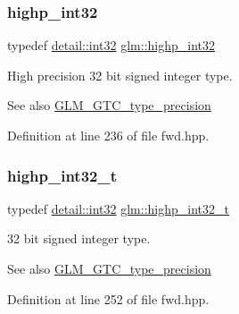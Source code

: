 \subsubsection{\texorpdfstring{highp\+\_\+int32}{highp\_int32}}
{\footnotesize\ttfamily typedef \hyperlink{namespaceglm_1_1detail_a9f85b4efeca416cdcec2fd08939a2e17}{detail\+::int32} \hyperlink{group__gtc__type__precision_gaa2045c92b9553d463191af6a20e997bb}{glm\+::highp\+\_\+int32}}

High precision 32 bit signed integer type. \begin{DoxySeeAlso}{See also}
\hyperlink{group__gtc__type__precision}{G\+L\+M\+\_\+\+G\+T\+C\+\_\+type\+\_\+precision} 
\end{DoxySeeAlso}


Definition at line 236 of file fwd.\+hpp.

\mbox{\label{group__gtc__type__precision_ga783d077a513c1f475f6cdb406b4238c3}} 
\subsubsection{\texorpdfstring{highp\+\_\+int32\+\_\+t}{highp\_int32\_t}}
{\footnotesize\ttfamily typedef \hyperlink{namespaceglm_1_1detail_a9f85b4efeca416cdcec2fd08939a2e17}{detail\+::int32} \hyperlink{group__gtc__type__precision_ga783d077a513c1f475f6cdb406b4238c3}{glm\+::highp\+\_\+int32\+\_\+t}}

32 bit signed integer type. \begin{DoxySeeAlso}{See also}
\hyperlink{group__gtc__type__precision}{G\+L\+M\+\_\+\+G\+T\+C\+\_\+type\+\_\+precision} 
\end{DoxySeeAlso}


Definition at line 252 of file fwd.\+hpp.

\mbox{\label{group__gtc__type__precision_ga7ffb27943e9569800979081bc548621c}} 
